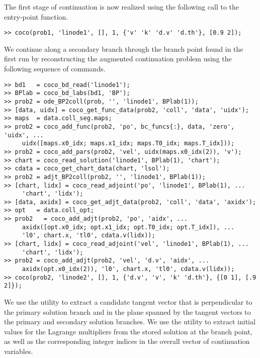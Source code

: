 The first stage of continuation is now realized using the following call to the  entry-point function.
\begin{lstlisting}[language=coco-highlight]
>> coco(prob1, 'linode1', [], 1, {'v' 'k' 'd.v' 'd.th'}, [0.9 2]);
\end{lstlisting}
We continue along a secondary branch through the branch point found in the first run by reconstructing the augmented continuation problem using the following sequence of commands.
\begin{lstlisting}[language=coco-highlight]
>> bd1   = coco_bd_read('linode1');
>> BPlab = coco_bd_labs(bd1, 'BP');
>> prob2 = ode_BP2coll(prob, '', 'linode1', BPlab(1));
>> [data, uidx] = coco_get_func_data(prob2, 'coll', 'data', 'uidx');
>> maps  = data.coll_seg.maps;
>> prob2 = coco_add_func(prob2, 'po', bc_funcs{:}, data, 'zero', 'uidx', ...
     uidx([maps.x0_idx; maps.x1_idx; maps.T0_idx; maps.T_idx]));
>> prob2 = coco_add_pars(prob2, 'vel', uidx(maps.x0_idx(2)), 'v');
>> chart = coco_read_solution('linode1', BPlab(1), 'chart');
>> cdata = coco_get_chart_data(chart, 'lsol');
>> prob2 = adjt_BP2coll(prob2, '', 'linode1', BPlab(1));
>> [chart, lidx] = coco_read_adjoint('po', 'linode1', BPlab(1), ...
     'chart', 'lidx');
>> [data, axidx] = coco_get_adjt_data(prob2, 'coll', 'data', 'axidx');
>> opt   = data.coll_opt;
>> prob2   = coco_add_adjt(prob2, 'po', 'aidx', ...
     axidx([opt.x0_idx; opt.x1_idx; opt.T0_idx; opt.T_idx]), ...
     'l0', chart.x, 'tl0', cdata.v(lidx));
>> [chart, lidx] = coco_read_adjoint('vel', 'linode1', BPlab(1), ...
     'chart', 'lidx');
>> prob2 = coco_add_adjt(prob2, 'vel', 'd.v', 'aidx', ...
     axidx(opt.x0_idx(2)), 'l0', chart.x, 'tl0', cdata.v(lidx));
>> coco(prob2, 'linode2', [], 1, {'d.v', 'v', 'k' 'd.th'}, {[0 1], [.9 2]});
\end{lstlisting}
We use the  utility to extract a candidate tangent vector that is perpendicular to the primary solution branch and in the plane spanned by the tangent vectors to the primary and secondary solution branches. We use the  utility to extract initial values for the Lagrange multipliers from the stored solution at the branch point, as well as the corresponding integer indices in the overall vector of continuation variables.


